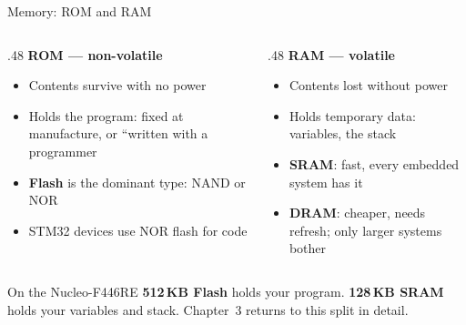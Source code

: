 \documentclass[9pt,aspectratio=169,xcolor=table]{beamer}
\begin{document}
\begin{frame}{Memory: ROM and RAM}
    \begin{columns}[T]
    \begin{column}{.48\textwidth}
        \textbf{ROM --- non-volatile}
        \begin{itemize}\itemsep1pt
            \item Contents survive with \alert{no power}
            \item Holds the program: fixed at manufacture, or
                  ``written with a programmer
            \item \textbf{Flash} is the dominant type: NAND or NOR
            \item STM32 devices use \alert{NOR flash} for code
        \end{itemize}
    \end{column}
    \begin{column}{.48\textwidth}
        \textbf{RAM --- volatile}
        \begin{itemize}\itemsep1pt
            \item Contents \alert{lost} without power
            \item Holds temporary data: variables, the stack
            \item \textbf{SRAM}: fast, every embedded system has it
            \item \textbf{DRAM}: cheaper, needs refresh; only larger
                  systems bother
        \end{itemize}
    \end{column}
    \end{columns}

    \vspace{3mm}
    \begin{block}{On the Nucleo-F446RE}
        \textbf{512\,KB Flash} holds your program. \textbf{128\,KB
        SRAM} holds your variables and stack. Chapter~3 returns to
        this split in detail.
    \end{block}
\end{frame}
\end{document}
